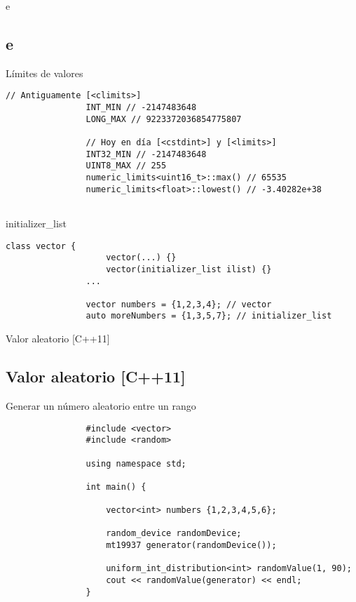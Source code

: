 \documentclass{beamer}
\newcommand{\normalSizeItem}[1] {
  \normalsize{\item #1}
}
\begin{document}
		\begin{frame}[fragile]{ e }	
			\subsection{ e }		
			\begin{itemize}
			
				\normalSizeItem { Límites de valores }
				\begin{lstlisting}[basicstyle={\tiny\ttfamily}]
				// Antiguamente [<climits>]
				INT_MIN // -2147483648
				LONG_MAX // 9223372036854775807
				
				// Hoy en día [<cstdint>] y [<limits>]
				INT32_MIN // -2147483648
				UINT8_MAX // 255
				numeric_limits<uint16_t>::max() // 65535
				numeric_limits<float>::lowest() // -3.40282e+38
				
				\end{lstlisting}
				
				\normalSizeItem { initializer\_list }
				\begin{lstlisting}[basicstyle={\tiny\ttfamily}]
				class vector {
					vector(...) {}
					vector(initializer_list ilist) {}
				...
				
				vector numbers = {1,2,3,4}; // vector
				auto moreNumbers = {1,3,5,7}; // initializer_list
				\end{lstlisting}
				
			\end{itemize}
		\end{frame}
		
		\begin{frame}[fragile]{Valor aleatorio [C++11]}	
			\subsection{Valor aleatorio [C++11]}
			\begin{itemize}
			
				\normalSizeItem { Generar un número aleatorio entre un rango }
				\begin{lstlisting}
				#include <vector>
				#include <random>
				
				using namespace std;
				
				int main() {	
					
					vector<int> numbers {1,2,3,4,5,6};
					
					random_device randomDevice;
					mt19937 generator(randomDevice());
					
					uniform_int_distribution<int> randomValue(1, 90);
					cout << randomValue(generator) << endl;
				}
				\end{lstlisting}				
			\end{itemize}
		\end{frame}
		
\end{document}

